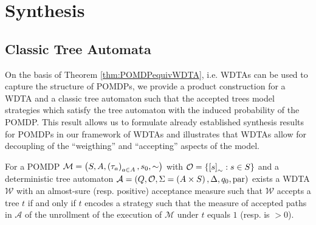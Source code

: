 \chapter{Synthesis}
\label{chapter:synthesis}

\section{Classic Tree Automata}
On the basis of Theorem \ref{thm:POMDPequivWDTA}, i.e. \acp{WDTA} can be used
to capture the structure of \acp{POMDP}, we provide a product construction for
a \ac{WDTA} and a classic tree automaton such that the accepted trees model
strategies which satisfy the tree automaton with the induced probability of the
\ac{POMDP}. This result allows us to formulate already established synthesis
results for \acp{POMDP} in our framework of \acp{WDTA} and illustrates that
\acp{WDTA} allow for decoupling of the \enquote{weigthing} and
\enquote{accepting} aspects of the model.
\begin{theorem}
  For a \ac{POMDP}
  $\mathcal{M} = \left(S,A,\left(\tau_{a}\right)_{a\in A},s_{0},\sim\right)$
  with $\mathcal{O} = \left\{\left[s\right]_{\sim}:s\in S\right\}$ and a deterministic
  tree automaton $\mathcal{A} = \left(Q, \mathcal{O}, \Sigma = \left(A\times
  S\right), \Delta, q_{0}, \operatorname{par}\right)$ exists a \ac{WDTA} $\mathcal{W}$ with an
  almost-sure (resp.  positive) acceptance measure such that $\mathcal{W}$
  accepts a tree $t$ if and only if $t$ encodes a strategy such that the
  measure of accepted paths in $\mathcal{A}$ of the unrollment of the execution
  of $\mathcal{M}$ under $t$ equals $1$ (resp. is $>0$).
\end{theorem}
